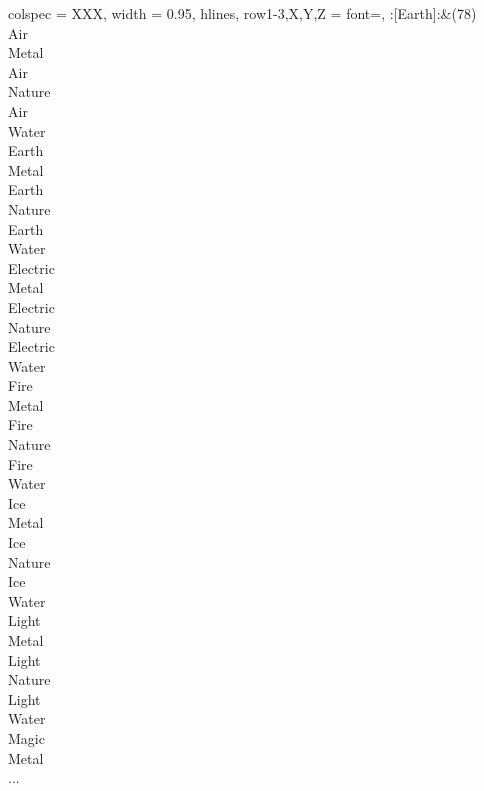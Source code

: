 \begin{longtblr}[
	caption = {2v1 Defending Weak},
	label = {2v1-Defending-Weak},
]{
	colspec = {XXX}, width = 0.95\linewidth,
	hlines,
	row{1-3,X,Y,Z} = {font=\bfseries},
}
	:[Earth]:&{(78)\\
	Air \\
	Metal \\
	Air \\
	Nature \\
	Air \\
	Water \\
	Earth \\
	Metal \\
	Earth \\
	Nature \\
	Earth \\
	Water \\
	Electric \\
	Metal \\
	Electric \\
	Nature \\
	Electric \\
	Water \\
	Fire \\
	Metal \\
	Fire \\
	Nature \\
	Fire \\
	Water \\
	Ice \\
	Metal \\
	Ice \\
	Nature \\
	Ice \\
	Water \\
	Light \\
	Metal \\
	Light \\
	Nature \\
	Light \\
	Water \\
	Magic \\
	Metal \\
	...\\
	}\\


\end{longtblr}
